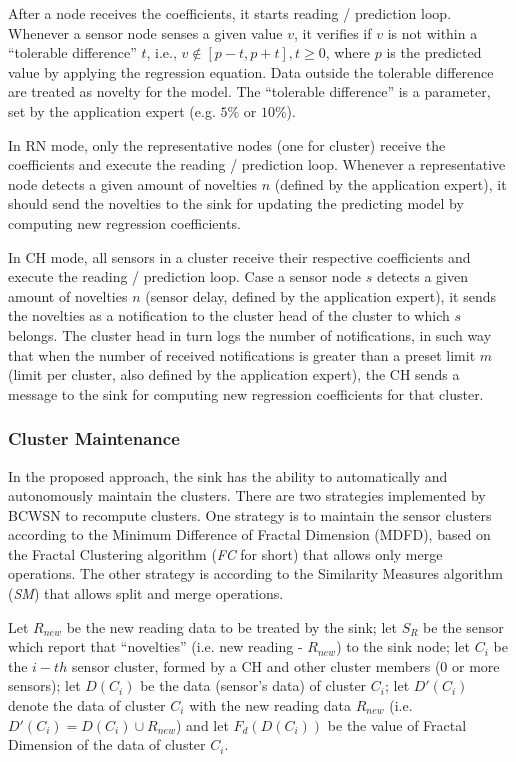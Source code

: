 \documentclass[conference]{IEEEtran}
\begin{document}
After a node receives the coefficients, it starts reading / prediction loop. 
Whenever a sensor node senses a given value $v$, it verifies if  $v$ is not
within a ``tolerable difference'' $t$, i.e., $v \not \in [p-t,p+t], t \geq 0$,
where $p$ is the predicted value by applying the regression equation. Data
outside the tolerable difference are treated as novelty for the model. The
``tolerable difference'' is a parameter, set by the application expert (e.g.
$5\%$ or $10\%$).

In RN mode, only the representative nodes (one for cluster) receive the
coefficients and execute the reading / prediction loop. Whenever a representative
node detects a given amount of novelties $n$ (defined by the application
expert), it should send the novelties to the sink for updating the predicting
model by computing new regression coefficients.

In CH mode, all sensors in a cluster receive their respective coefficients and
execute the reading / prediction loop. Case a sensor node $s$ detects a given
amount of novelties $n$ (sensor delay, defined by the application expert), it
sends the novelties as a notification to the cluster head of the cluster to which $s$ belongs. The cluster head in turn logs the
number of notifications, in such way that when the number of received
notifications is greater than a preset limit $m$ (limit per cluster, also
defined by the application expert), the CH sends a message to the sink for
computing new regression coefficients for that cluster.


\subsubsection{Cluster Maintenance}

In the proposed approach, the sink has the ability to automatically and
autonomously maintain the clusters. There are two strategies implemented by
BCWSN to recompute clusters. One strategy is to maintain the sensor clusters
according to the Minimum Difference of Fractal Dimension (MDFD), based on the
Fractal Clustering algorithm (\textit{FC} for short) that allows only
merge operations. The other strategy is according to the Similarity
Measures algorithm (\textit{SM}) that allows split and merge operations.

Let $R_{new}$ be the new reading data to be treated by the sink; let $S_{R}$ be
the sensor which report that ``novelties'' (i.e. new reading - $R_{new}$) to the
sink node; let $C_i$ be the $i-th$ sensor cluster, formed by a 
CH and other cluster members (0 or more sensors); let $D(C_i)$
be the data (sensor's data) of cluster $C_i$; let $D'(C_i)$ denote the data of
cluster $C_i$ with the new reading data $R_{new}$ (i.e. $D'(C_i) = D(C_i) \cup
R_{new}$) and let $F_{d}(D(C_i))$ be the value of Fractal Dimension of the data
of cluster $C_i$.
\end{document}
